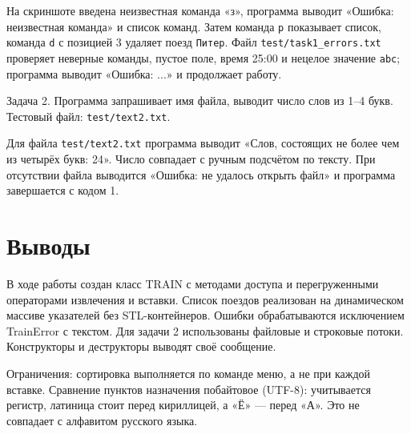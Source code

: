 \documentclass[
    oneside, %
    12pt %
]{article}
\begin{document}
На скриншоте введена неизвестная команда «з», программа выводит «Ошибка: неизвестная команда»
и список команд. Затем команда \texttt{p} показывает список, команда \texttt{d} с позицией 3
удаляет поезд \texttt{Питер}. Файл \texttt{test/task1\_errors.txt} проверяет неверные команды, пустое поле,
время 25:00 и нецелое значение \texttt{abc}; программа выводит «Ошибка: ...» и продолжает работу.

Задача 2. Программа запрашивает имя файла, выводит число слов из 1--4 букв.
Тестовый файл: \texttt{test/text2.txt}.

Для файла \texttt{test/text2.txt} программа выводит «Слов, состоящих не более чем из
четырёх букв: 24». Число совпадает с ручным подсчётом по тексту. При отсутствии файла
выводится «Ошибка: не удалось открыть файл» и программа завершается с кодом 1.

\section{Выводы}
В ходе работы создан класс TRAIN с методами доступа и перегруженными операторами
извлечения и вставки. Список поездов реализован на динамическом массиве указателей без
STL-контейнеров. Ошибки обрабатываются исключением TrainError с текстом. Для задачи 2
использованы файловые и строковые потоки. Конструкторы и деструкторы выводят своё
сообщение.

Ограничения: сортировка выполняется по команде меню, а не при каждой вставке.
Сравнение пунктов назначения побайтовое (UTF-8): учитывается регистр, латиница стоит
перед кириллицей, а «Ё» --- перед «А». Это не совпадает с алфавитом русского языка.
\end{document}

